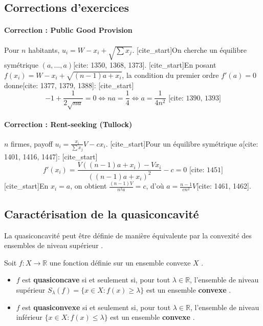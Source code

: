 \subsection{Corrections d'exercices}

\paragraph{Correction : Public Good Provision}
Pour $n$ habitants, $u_i = W - x_i + \sqrt{\sum x_j}$. [cite_start]On cherche un équilibre symétrique $(a, \dots, a)$[cite: 1350, 1368, 1373].
[cite_start]En posant $f(x_i) = W - x_i + \sqrt{(n-1)a + x_i}$, la condition du premier ordre $f'(a) = 0$ donne[cite: 1377, 1379, 1388]:
[cite_start]$$-1 + \frac{1}{2\sqrt{na}} = 0 \iff na = \frac{1}{4} \iff a = \frac{1}{4n^2} \text{ [cite: 1390, 1393]}$$

\paragraph{Correction : Rent-seeking (Tullock)}
$n$ firmes, payoff $u_i = \frac{x_i}{\sum x_j}V - cx_i$. [cite_start]Pour un équilibre symétrique $a$[cite: 1401, 1416, 1447]:
[cite_start]$$f'(x_i) = \frac{V((n-1)a + x_i) - Vx_i}{((n-1)a + x_i)^2} - c = 0 \text{ [cite: 1451]}$$
[cite_start]En $x_i = a$, on obtient $\frac{(n-1)V}{n^2 a} = c$, d'où $a = \frac{n-1}{cn^2}V$[cite: 1461, 1462].


\subsection{Caractérisation de la quasiconcavité}

La quasiconcavité peut être définie de manière équivalente par la convexité des ensembles de niveau supérieur \cite{Note 10 oct. 2024.pdf}.

\begin{proposition}
Soit $f: X \rightarrow \mathbb{R}$ une fonction définie sur un ensemble convexe $X$ \cite{Note 10 oct. 2024.pdf}.
\begin{itemize}
    \item $f$ est \textbf{quasiconcave} si et seulement si, pour tout $\lambda \in \mathbb{R}$, l'ensemble de niveau supérieur $S_{\lambda}(f) = \{x \in X : f(x) \ge \lambda\}$ est un ensemble \textbf{convexe} \cite{Note 10 oct. 2024.pdf}.
    \item $f$ est \textbf{quasiconvexe} si et seulement si, pour tout $\lambda \in \mathbb{R}$, l'ensemble de niveau inférieur $\{x \in X : f(x) \le \lambda\}$ est un ensemble \textbf{convexe} \cite{Note 10 oct. 2024.pdf}.
\end{itemize}
\end{proposition}

